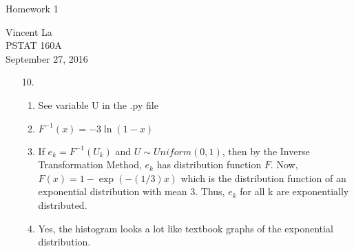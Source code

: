 \documentclass[11pt]{article}
\title{ }
\begin{document}
	\begin{center}	%
		\Large{Homework 1}	%
	\end{center}
	\begin{center}
		Vincent La \\
		PSTAT 160A \\
		September 27, 2016
	\end{center}

\begin{enumerate}

\item[10.]
	\begin{enumerate}
		\item See variable U in the .py file
		\item $F^{-1}(x) = -3 \ln(1-x)$
		\item If $e_k = F^{-1}(U_k)$ and $U \sim Uniform(0,1)$, then by the Inverse Transformation Method, $e_k$ has distribution function $F$. 
		Now, $F(x) = 1 - \exp(-(1/3)x)$ which is the distribution function of an exponential distribution with mean 3. Thus, $e_k$ for all k are exponentially distributed.
		\item Yes, the histogram looks a lot like textbook graphs of the exponential distribution.
	\end{enumerate}
\end{enumerate}
\end{document}
